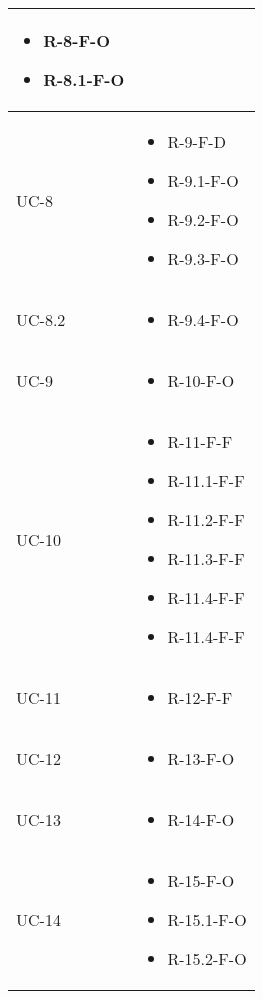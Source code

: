 \begin{center}
\begin{longtable}{| C{6cm} |C{6cm}|}
\begin{itemize}
        \item R-8-F-O
        \item R-8.1-F-O
    \end{itemize}  \\\hline
    UC-8 &
    \begin{itemize}
        \item R-9-F-D
        \item R-9.1-F-O
        \item R-9.2-F-O
        \item R-9.3-F-O
    \end{itemize} \\\hline
    UC-8.2 &
    \begin{itemize}
        \item R-9.4-F-O
    \end{itemize}\\\hline
    UC-9 & \begin{itemize}
               \item R-10-F-O
    \end{itemize}\\\hline
    UC-10 &
    \begin{itemize}
        \item R-11-F-F
        \item R-11.1-F-F
        \item R-11.2-F-F
        \item R-11.3-F-F
        \item R-11.4-F-F
        \item R-11.4-F-F
    \end{itemize}
    \\\hline

    UC-11 &
    \begin{itemize}
        \item R-12-F-F
    \end{itemize}
    \\\hline

    UC-12 &
    \begin{itemize}
        \item R-13-F-O
    \end{itemize}
    \\\hline

    UC-13 &
    \begin{itemize}
        \item R-14-F-O
    \end{itemize}\\\hline
    UC-14 &
    \begin{itemize}
        \item R-15-F-O
        \item R-15.1-F-O
        \item R-15.2-F-O
    \end{itemize}\\\hline


\end{longtable}
\end{center}
